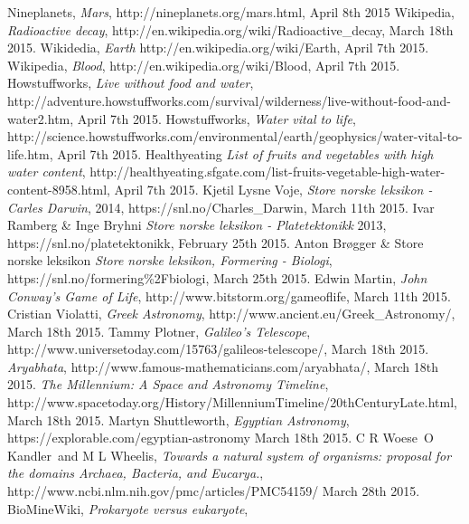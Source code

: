 \begin{thebibliography}{99}
		Nineplanets,
		\emph{Mars},
		http://nineplanets.org/mars.html,
		April 8th 2015
		Wikipedia,
		\emph{Radioactive decay},
		http://en.wikipedia.org/wiki/Radioactive\_decay,
		March 18th 2015.
		Wikidedia,
		\emph{Earth}
		http://en.wikipedia.org/wiki/Earth,
		April 7th 2015.
		Wikipedia,
		\emph{Blood},
		http://en.wikipedia.org/wiki/Blood,
		April 7th 2015.
		Howstuffworks,
		\emph{Live without food and water},
		http://adventure.howstuffworks.com/survival/wilderness/live-without-food-and-water2.htm,
		April 7th 2015.
		Howstuffworks,
		\emph{Water vital to life},
		http://science.howstuffworks.com/environmental/earth/geophysics/water-vital-to-life.htm,
		April 7th 2015.
		Healthyeating
		\emph{List of fruits and vegetables with high water content},
		http://healthyeating.sfgate.com/list-fruits-vegetable-high-water-content-8958.html,
		April 7th 2015.
		Kjetil Lysne Voje,
		\emph{Store norske leksikon - Carles Darwin},
		2014,
		https://snl.no/Charles\_Darwin,
		March 11th 2015.
		Ivar Ramberg \& Inge Bryhni
		\emph{Store norske leksikon - Platetektonikk}
		2013,
		https://snl.no/platetektonikk,
		February 25th 2015.
		Anton Brøgger \& Store norske leksikon
		\emph{Store norske leksikon, Formering - Biologi},
		https://snl.no/formering\%2Fbiologi,
		March 25th 2015.
		Edwin Martin,
		\emph{John Conway's Game of Life},
		http://www.bitstorm.org/gameoflife,
		March 11th 2015.
		Cristian Violatti,
		\emph{Greek Astronomy},
		http://www.ancient.eu/Greek\_Astronomy/,
		March 18th 2015.
		Tammy Plotner,
		\emph{Galileo's Telescope},
		http://www.universetoday.com/15763/galileos-telescope/,
		March 18th 2015.
		\emph{Aryabhata},
		http://www.famous-mathematicians.com/aryabhata/,
		March 18th 2015.
		\emph{The Millennium: A Space and Astronomy Timeline},
		http://www.spacetoday.org/History/MillenniumTimeline/20thCenturyLate.html,
		March 18th 2015.
		Martyn Shuttleworth,
		\emph{Egyptian Astronomy},
		https://explorable.com/egyptian-astronomy
		March 18th 2015.
		C R Woese\, O Kandler\, and M L Wheelis,
		\emph{Towards a natural system of organisms: proposal for the domains Archaea, Bacteria, and Eucarya.},
		http://www.ncbi.nlm.nih.gov/pmc/articles/PMC54159/
		March 28th 2015.
		 BioMineWiki,
		\emph{Prokaryote versus eukaryote},

\end{thebibliography}
